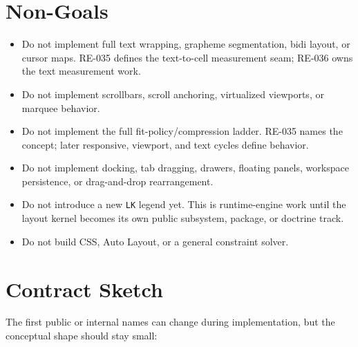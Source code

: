 \section{Non-Goals}\label{record-163-non-goals}

\begin{itemize}
\tightlist
\item
  Do not implement full text wrapping, grapheme segmentation, bidi layout, or cursor maps. RE-035 defines the text-to-cell measurement seam; RE-036 owns the text measurement work.
\item
  Do not implement scrollbars, scroll anchoring, virtualized viewports, or marquee behavior.
\item
  Do not implement the full fit-policy/compression ladder. RE-035 names the concept; later responsive, viewport, and text cycles define behavior.
\item
  Do not implement docking, tab dragging, drawers, floating panels, workspace persistence, or drag-and-drop rearrangement.
\item
  Do not introduce a new \texttt{L\allowbreak{}K} legend yet. This is runtime-engine work until the layout kernel becomes its own public subsystem, package, or doctrine track.
\item
  Do not build CSS, Auto Layout, or a general constraint solver.
\end{itemize}

\section{Contract Sketch}\label{record-163-contract-sketch}

The first public or internal names can change during implementation, but the conceptual shape should stay small:

